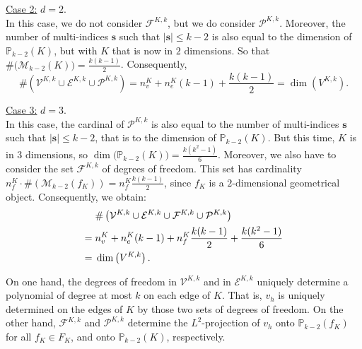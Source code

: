 \noindent \underline{Case 2:} $d=2$.\\
\noindent In this case, we do not consider $\mathcal{F}^{K,k}$, but we do consider $\mathcal{P}^{K,k}$. Moreover, the number of multi-indices $\mathbf{s}$ such that $|\mathbf{s}|\leq k-2$ is also equal to the dimension of $\mathbb{P}_{k-2}(K)$, but with $K$ that is now in $2$ dimensions. So that $\#\big(\mathcal{M}_{k-2}(K)\big) = \frac{k(k-1)}{2}$. Consequently, 
$$\#\left(\mathcal{V}^{K,k}\cup \mathcal{E}^{K,k} \cup\mathcal{P}^{K,k}\right)=n_v^K
+ n_e^K(k-1) + \frac{k(k-1)}{2}= \dim\left(V^{K,k}\right).
$$

\noindent \underline{Case 3:} $d=3$.\\
\noindent In this case, the cardinal of $\mathcal{P}^{K,k}$ is also equal to the number of multi-indices $\mathbf{s}$ such that $|\mathbf{s}|\leq k-2$, that is to the dimension of $\mathbb{P}_{k-2}(K)$. But this time, $K$ is in $3$ dimensions, so $\dim\big(\mathbb{P}_{k-2}(K)\big) = \frac{k(k^2-1)}{6}.$ Moreover, we also have to consider the set $\mathcal{F}^{K,k}$ of degrees of freedom. This set has cardinality $n_f^K\cdot\#\left(\mathcal{M}_{k-2}(f_K)\right) = n_f^K\frac{k(k-1)}{2}$, since $f_K$ is a $2$-dimensional geometrical object. Consequently, we obtain:
\begin{align*}
&\#\left(\mathcal{V}^{K,k}\cup \mathcal{E}^{K,k}\cup\mathcal{F}^{K,k} \cup\mathcal{P}^{K,k}\right)\\
= \hspace{1mm}&n_v^K
+ n_e^K(k-1) + n_f^K\frac{k(k-1)}{2} + \frac{k(k^2-1)}{6}\\
= \hspace{1mm}&\dim\left(V^{K,k}\right).
\end{align*}

\begin{remark}\label{existvhfromdof}
On one hand, the degrees of freedom in $\mathcal{V}^{K,k}$ and in $\mathcal{E}^{K,k}$ uniquely determine a polynomial of degree at most $k$ on each edge of $K$. That is, $v_h$ is uniquely determined on the edges of $K$ by those two sets of degrees of freedom. On the other hand, $\mathcal{F}^{K,k}$ and $\mathcal{P}^{K,k}$ determine the $L^2$-projection of $v_h$ onto $\mathbb{P}_{k-2}(f_K)$ for all $f_K \in F_K$, and onto $\mathbb{P}_{k-2}(K)$, respectively. 
\end{remark}

